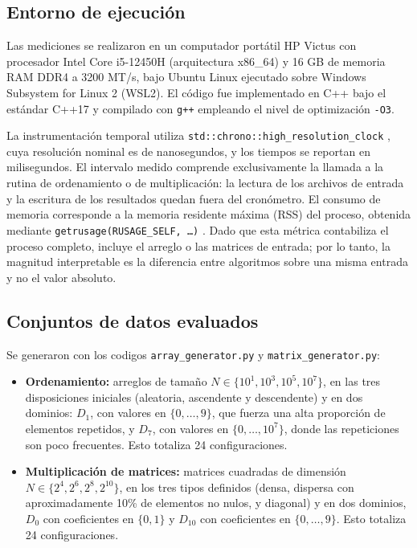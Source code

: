 \subsection{Entorno de ejecución}

Las mediciones se realizaron en un computador portátil HP Victus con procesador Intel Core i5-12450H (arquitectura x86\_64) y 16 GB de memoria RAM DDR4 a 3200 MT/s, bajo Ubuntu Linux ejecutado sobre Windows Subsystem for Linux 2 (WSL2). El código fue implementado en C++ bajo el estándar C++17 y compilado con \texttt{g++} empleando el nivel de optimización \texttt{-O3}.

La instrumentación temporal utiliza \texttt{std::chrono::high\_resolution\_clock} \cite{cppref_chrono}, cuya resolución nominal es de nanosegundos, y los tiempos se reportan en milisegundos. El intervalo medido comprende exclusivamente la llamada a la rutina de ordenamiento o de multiplicación: la lectura de los archivos de entrada y la escritura de los resultados quedan fuera del cronómetro. El consumo de memoria corresponde a la memoria residente máxima (RSS) del proceso, obtenida mediante \texttt{getrusage(RUSAGE\_SELF, \dots)} \cite{man_getrusage}. Dado que esta métrica contabiliza el proceso completo, incluye el arreglo o las matrices de entrada; por lo tanto, la magnitud interpretable es la diferencia entre algoritmos sobre una misma entrada y no el valor absoluto.

\subsection{Conjuntos de datos evaluados}

Se generaron con los codigos  \texttt{array\_generator.py} y \texttt{matrix\_generator.py}:

\begin{itemize}
    \item \textbf{Ordenamiento:} arreglos de tamaño $N \in \{10^{1}, 10^{3}, 10^{5}, 10^{7}\}$, en las tres disposiciones iniciales (aleatoria, ascendente y descendente) y en dos dominios: $D_{1}$, con valores en $\{0,\dots,9\}$, que fuerza una alta proporción de elementos repetidos, y $D_{7}$, con valores en $\{0,\dots,10^{7}\}$, donde las repeticiones son poco frecuentes. Esto totaliza 24 configuraciones.
    \item \textbf{Multiplicación de matrices:} matrices cuadradas de dimensión $N \in \{2^{4}, 2^{6}, 2^{8}, 2^{10}\}$, en los tres tipos definidos (densa, dispersa con aproximadamente 10\% de elementos no nulos, y diagonal) y en dos dominios, $D_{0}$ con coeficientes en $\{0,1\}$ y $D_{10}$ con coeficientes en $\{0,\dots,9\}$. Esto totaliza 24 configuraciones.
\end{itemize}

